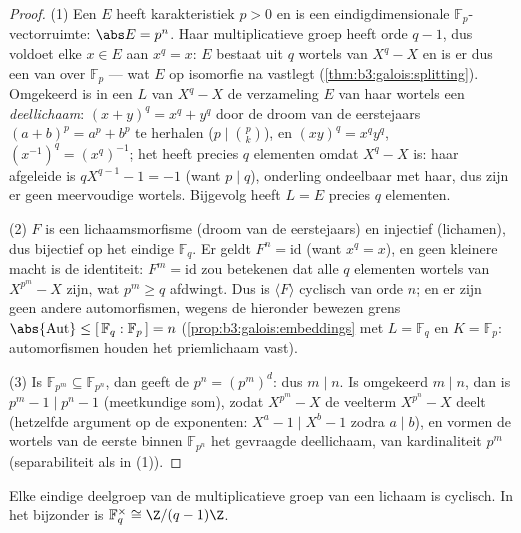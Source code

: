 \begin{proof}
(1) Een  $E$ heeft karakteristiek $p > 0$ en is een
eindigdimensionale $\mathbb F_p$-vectorruimte: $\abs E = p^n$.
Haar multiplicatieve groep heeft orde $q - 1$, dus voldoet elke $x
\in E$ aan $x^q = x$: $E$ bestaat uit $q$ wortels van $X^q - X$ en
is er dus een  van over $\mathbb F_p$ --- wat $E$
op isomorfie na vastlegt (\cref{thm:b3:galois:splitting}).
Omgekeerd is in een  $L$ van $X^q - X$ de
verzameling $E$ van haar wortels een \emph{deellichaam}: $(x +
y)^q = x^q + y^q$ door de droom van de eerstejaars $(a+b)^p = a^p
+ b^p$ te herhalen ($p \mid \binom pk$), en $(xy)^q = x^qy^q$,
$(x^{-1})^q = (x^q)^{-1}$; het heeft precies $q$ elementen omdat
$X^q - X$  is: haar afgeleide is $qX^{q-1} - 1 = -1$
(want $p \mid q$), onderling ondeelbaar met haar, dus zijn er geen
meervoudige wortels. Bijgevolg heeft $L = E$ precies $q$
elementen.

(2) $F$ is een lichaamsmorfisme (droom van de eerstejaars) en
injectief (lichamen), dus bijectief op het eindige $\mathbb F_q$.
Er geldt $F^n = \mathrm{id}$ (want $x^q = x$), en geen kleinere
macht is de identiteit: $F^m = \mathrm{id}$ zou betekenen dat alle
$q$ elementen wortels van $X^{p^m} - X$ zijn, wat $p^m \geq q$
afdwingt. Dus is $\langle F\rangle$ cyclisch van orde $n$; en er
zijn geen andere automorfismen, wegens de hieronder bewezen grens
$\abs{\operatorname{Aut}} \leq [\,\mathbb F_q : \mathbb F_p\,] =
n$ (\cref{prop:b3:galois:embeddings} met $L = \mathbb F_q$ en $K =
\mathbb F_p$: automorfismen houden het priemlichaam vast).

(3) Is $\mathbb F_{p^m} \subseteq \mathbb F_{p^n}$, dan geeft de
 $p^n = (p^m)^d$: dus $m \mid n$. Is omgekeerd $m \mid n$,
dan is $p^m - 1 \mid p^n - 1$ (meetkundige som), zodat $X^{p^m} -
X$ de veelterm $X^{p^n} - X$ deelt (hetzelfde argument op de
exponenten: $X^{a} - 1 \mid X^{b} - 1$ zodra $a \mid b$), en
vormen de wortels van de eerste binnen $\mathbb F_{p^n}$ het
gevraagde deellichaam, van kardinaliteit $p^m$ (separabiliteit als
in (1)).
\end{proof}

\begin{theorem}[Cycliciteit]\label{thm:b3:galois:cyclic}
Elke eindige deelgroep van de multiplicatieve groep van een
lichaam is cyclisch. In het bijzonder is $\mathbb F_q^\times \cong
\Z/(q-1)\Z$.
\end{theorem}

